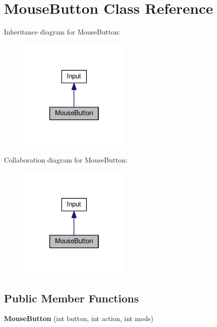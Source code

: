 \hypertarget{classMouseButton}{}\section{Mouse\+Button Class Reference}
\label{classMouseButton}


Inheritance diagram for Mouse\+Button\+:
\nopagebreak
\begin{figure}[H]
\begin{center}
\leavevmode
\includegraphics[width=154pt]{classMouseButton__inherit__graph}
\end{center}
\end{figure}


Collaboration diagram for Mouse\+Button\+:
\nopagebreak
\begin{figure}[H]
\begin{center}
\leavevmode
\includegraphics[width=154pt]{classMouseButton__coll__graph}
\end{center}
\end{figure}
\subsection*{Public Member Functions}
\begin{DoxyCompactItemize}
\item 
{\bfseries Mouse\+Button} (int button, int action, int mods)\hypertarget{classMouseButton_ad2a2ab9c8a5d0a95bae134566462136c}{}\label{classMouseButton_ad2a2ab9c8a5d0a95bae134566462136c}

\end{DoxyCompactItemize}

